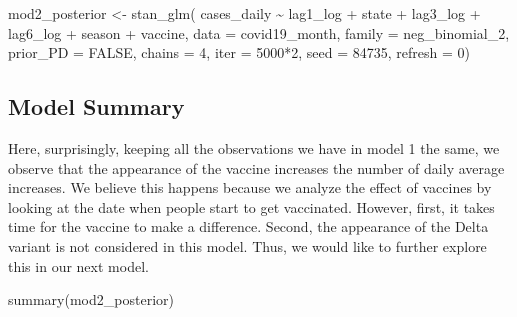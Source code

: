\documentclass[
]{book}
\newenvironment{Shaded}{\begin{snugshade}}{\end{snugshade}}
\newcommand{\AttributeTok}[1]{\textcolor[rgb]{0.77,0.63,0.00}{#1}}
\newcommand{\ConstantTok}[1]{\textcolor[rgb]{0.00,0.00,0.00}{#1}}
\newcommand{\DecValTok}[1]{\textcolor[rgb]{0.00,0.00,0.81}{#1}}
\newcommand{\FunctionTok}[1]{\textcolor[rgb]{0.00,0.00,0.00}{#1}}
\newcommand{\NormalTok}[1]{#1}
\newcommand{\OtherTok}[1]{\textcolor[rgb]{0.56,0.35,0.01}{#1}}
\newcommand{\SpecialCharTok}[1]{\textcolor[rgb]{0.00,0.00,0.00}{#1}}
\begin{document}
\begin{Shaded}
\begin{Highlighting}[]
\NormalTok{mod2\_posterior }\OtherTok{\textless{}{-}} \FunctionTok{stan\_glm}\NormalTok{(}
\NormalTok{  cases\_daily }\SpecialCharTok{\textasciitilde{}}\NormalTok{ lag1\_log }\SpecialCharTok{+}\NormalTok{ state }\SpecialCharTok{+}\NormalTok{ lag3\_log }\SpecialCharTok{+}\NormalTok{ lag6\_log }\SpecialCharTok{+}\NormalTok{ season }\SpecialCharTok{+}\NormalTok{ vaccine, }\AttributeTok{data =}\NormalTok{ covid19\_month,}
  \AttributeTok{family =}\NormalTok{ neg\_binomial\_2,}
  \AttributeTok{prior\_PD =} \ConstantTok{FALSE}\NormalTok{,}
  \AttributeTok{chains =} \DecValTok{4}\NormalTok{, }\AttributeTok{iter =} \DecValTok{5000}\SpecialCharTok{*}\DecValTok{2}\NormalTok{, }\AttributeTok{seed =} \DecValTok{84735}\NormalTok{, }\AttributeTok{refresh =} \DecValTok{0}\NormalTok{)}
\end{Highlighting}
\end{Shaded}

\hypertarget{model-summary-1}{%
\subsection{Model Summary}\label{model-summary-1}}

Here, surprisingly, keeping all the observations we have in model 1 the same, we observe that the appearance of the vaccine increases the number of daily average increases. We believe this happens because we analyze the effect of vaccines by looking at the date when people start to get vaccinated. However, first, it takes time for the vaccine to make a difference. Second, the appearance of the Delta variant is not considered in this model. Thus, we would like to further explore this in our next model.

\begin{Shaded}
\begin{Highlighting}[]
\FunctionTok{summary}\NormalTok{(mod2\_posterior)}
\end{Highlighting}
\end{Shaded}
\end{document}
